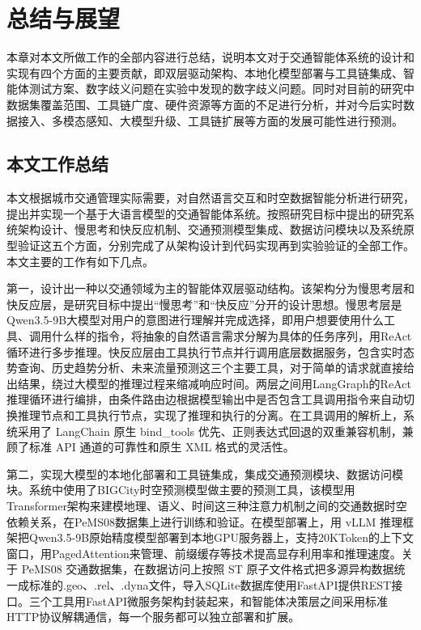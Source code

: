\chapter{总结与展望}

本章对本文所做工作的全部内容进行总结，说明本文对于交通智能体系统的设计和实现有四个方面的主要贡献，即双层驱动架构、本地化模型部署与工具链集成、智能体测试方案、数字歧义问题在实验中发现的数字歧义问题。同时对目前的研究中数据集覆盖范围、工具链广度、硬件资源等方面的不足进行分析，并对今后实时数据接入、多模态感知、大模型升级、工具链扩展等方面的发展可能性进行预测。

\section{本文工作总结}

本文根据城市交通管理实际需要，对自然语言交互和时空数据智能分析进行研究，提出并实现一个基于大语言模型的交通智能体系统。按照研究目标中提出的研究系统架构设计、慢思考和快反应机制、交通预测模型集成、数据访问模块以及系统原型验证这五个方面，分别完成了从架构设计到代码实现再到实验验证的全部工作。本文主要的工作有如下几点。

第一，设计出一种以交通领域为主的智能体双层驱动结构。该架构分为慢思考层和快反应层，是研究目标中提出“慢思考”和“快反应”分开的设计思想。慢思考层是Qwen3.5-9B大模型对用户的意图进行理解并完成选择，即用户想要使用什么工具、调用什么样的指令，将抽象的自然语言需求分解为具体的任务序列，用ReAct循环进行多步推理。快反应层由工具执行节点并行调用底层数据服务，包含实时态势查询、历史趋势分析、未来流量预测这三个主要工具，对于简单的请求就直接给出结果，绕过大模型的推理过程来缩减响应时间。两层之间用LangGraph的ReAct推理循环进行编排，由条件路由边根据模型输出中是否包含工具调用指令来自动切换推理节点和工具执行节点，实现了推理和执行的分离。在工具调用的解析上，系统采用了 LangChain 原生 bind\_tools 优先、正则表达式回退的双重兼容机制，兼顾了标准 API 通道的可靠性和原生 XML 格式的灵活性。

第二，实现大模型的本地化部署和工具链集成，集成交通预测模块、数据访问模块。系统中使用了BIGCity时空预测模型做主要的预测工具，该模型用Transformer架构来建模地理、语义、时间这三种注意力机制之间的交通数据时空依赖关系，在PeMS08数据集上进行训练和验证。在模型部署上，用 vLLM 推理框架把Qwen3.5-9B原始精度模型部署到本地GPU服务器上，支持20KToken的上下文窗口，用PagedAttention来管理、前缀缓存等技术提高显存利用率和推理速度。关于 PeMS08 交通数据集，在数据访问上按照 ST 原子文件格式把多源异构数据统一成标准的.geo、.rel、.dyna文件，导入SQLite数据库使用FastAPI提供REST接口。三个工具用FastAPI微服务架构封装起来，和智能体决策层之间采用标准HTTP协议解耦通信，每一个服务都可以独立部署和扩展。

